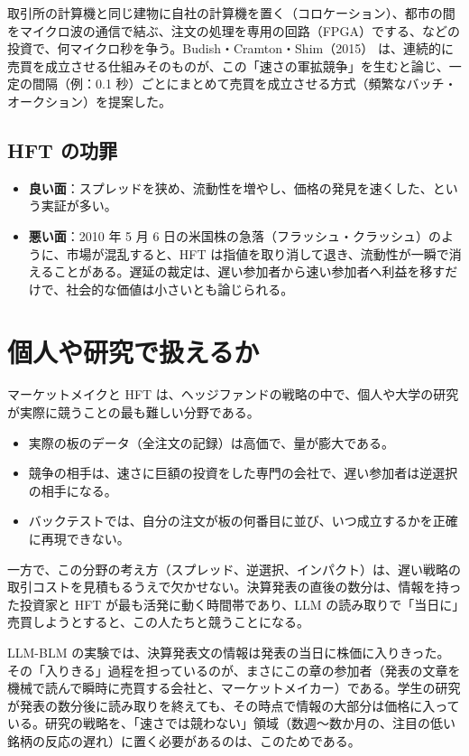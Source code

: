 取引所の計算機と同じ建物に自社の計算機を置く（コロケーション）、都市の間をマイクロ波の通信で結ぶ、注文の処理を専用の回路（FPGA）でする、などの投資で、何マイクロ秒を争う。Budish・Cramton・Shim（2015）\cite{bcs2015} は、連続的に売買を成立させる仕組みそのものが、この「速さの軍拡競争」を生むと論じ、一定の間隔（例：0.1 秒）ごとにまとめて売買を成立させる方式（頻繁なバッチ・オークション）を提案した。

\subsection{HFT の功罪}

\begin{itemize}
\item \textbf{良い面}：スプレッドを狭め、流動性を増やし、価格の発見を速くした、という実証が多い。
\item \textbf{悪い面}：2010 年 5 月 6 日の米国株の急落（フラッシュ・クラッシュ）のように、市場が混乱すると、HFT は指値を取り消して退き、流動性が一瞬で消えることがある。遅延の裁定は、遅い参加者から速い参加者へ利益を移すだけで、社会的な価値は小さいとも論じられる。
\end{itemize}

\section{個人や研究で扱えるか}

マーケットメイクと HFT は、ヘッジファンドの戦略の中で、個人や大学の研究が実際に競うことの最も難しい分野である。

\begin{itemize}
\item 実際の板のデータ（全注文の記録）は高価で、量が膨大である。
\item 競争の相手は、速さに巨額の投資をした専門の会社で、遅い参加者は逆選択の相手になる。
\item バックテストでは、自分の注文が板の何番目に並び、いつ成立するかを正確に再現できない。
\end{itemize}

一方で、この分野の考え方（スプレッド、逆選択、インパクト）は、遅い戦略の取引コストを見積もるうえで欠かせない。決算発表の直後の数分は、情報を持った投資家と HFT が最も活発に動く時間帯であり、LLM の読み取りで「当日に」売買しようとすると、この人たちと競うことになる。

\begin{projbox}
LLM-BLM の実験では、決算発表文の情報は発表の当日に株価に入りきった。その「入りきる」過程を担っているのが、まさにこの章の参加者（発表の文章を機械で読んで瞬時に売買する会社と、マーケットメイカー）である。学生の研究が発表の数分後に読み取りを終えても、その時点で情報の大部分は価格に入っている。研究の戦略を、「速さでは競わない」領域（数週〜数か月の、注目の低い銘柄の反応の遅れ）に置く必要があるのは、このためである。
\end{projbox}
